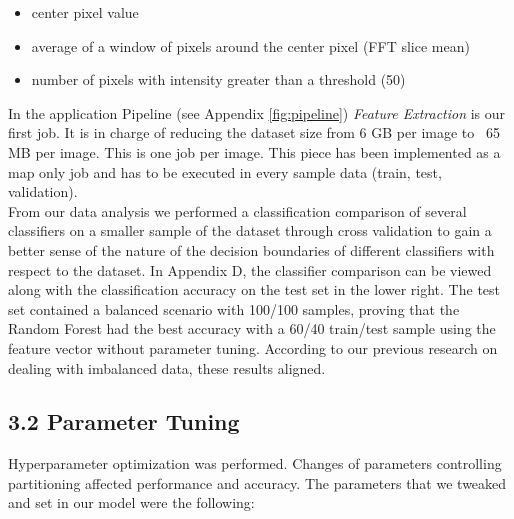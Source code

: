 \documentclass{neu_handout}
\begin{document}
\begin{itemize}
\setlength\itemsep{0.2em}
\item center pixel value
\item average of a window of pixels around the center pixel (FFT slice mean)
\item number of pixels with intensity greater than a threshold (50)
\end{itemize}

In the application Pipeline (see Appendix \ref{fig:pipeline}) \textit{Feature Extraction} is our first job. It is in charge of reducing the dataset size from 6 GB per image to ~65 MB per image. This is one job per image. This piece has been implemented as a map only job and has to be executed in every sample data (train, test, validation). \\

From our data analysis we performed a classification comparison of several classifiers on a smaller sample of the dataset through cross validation to gain a better sense of the nature of the decision boundaries of different classifiers with respect to the dataset. In Appendix D, the classifier comparison can be viewed along with the classification accuracy on the test set in the lower right. The test set contained a balanced scenario with 100/100 samples, proving that the Random Forest had the best accuracy with a 60/40 train/test sample using the feature vector without parameter tuning. According to our previous research on dealing with imbalanced data, these results aligned.

\subsection*{3.2 Parameter Tuning}

Hyperparameter optimization was performed. Changes of parameters controlling partitioning affected performance and accuracy. The parameters that we tweaked and set in our model were the following:
\end{document}

